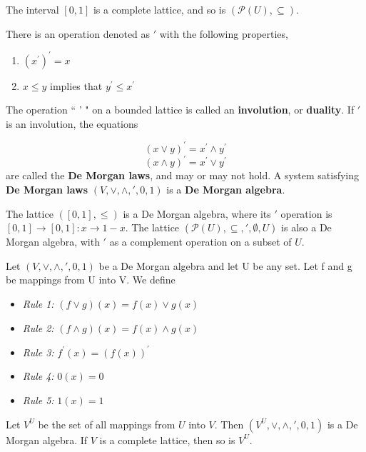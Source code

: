 The interval $[0,1]$ is a complete lattice, and so is $(\mathcal{P}(U),\subseteq)$.

There is an operation denoted as $'$ with the following properties,

\begin{enumerate}

\item $(x^{'})^{'} = x$
\item $x \leq y$ implies that $y^{'} \leq x^{'}$

\end{enumerate}

The operation `` ' " on a bounded lattice is called an \textbf{involution}, or \textbf{duality}. If $'$ is an involution, the equations

\[(x \vee y)^{'} = x^{'} \wedge y^{'}\]
\[(x \wedge y)^{'} = x^{'} \vee y^{'}\]
are called the \textbf{De Morgan laws}, and may or may not hold. A system satisfying \textbf{De Morgan laws} $(V,\vee,\wedge,',0,1)$ is a \textbf{De Morgan algebra}.

The lattice $([0,1], \leq)$ is a De Morgan algebra, where its $'$ operation is $[0,1] \rightarrow [0,1]: x \rightarrow 1-x$. The lattice $(\mathcal{P}(U), \subseteq, ', \emptyset, U)$ is also a De Morgan algebra, with $'$ as a complement operation on a subset of $U$.

\begin{thm}
\label{thm:correspondingtheorem}
Let $(V,\vee,\wedge,',0,1)$ be a De Morgan algebra and let U be any set. Let f and g be mappings from U into V. We define

\begin{itemize}

\item \textit{Rule 1:} $(f \vee g)(x) = f(x) \vee g(x)$
\item \textit{Rule 2:} $(f \wedge g)(x) = f(x) \wedge g(x)$
\item \textit{Rule 3:} $f^{'}(x) = (f(x))^{'}$
\item \textit{Rule 4:} $0(x) = 0$
\item \textit{Rule 5:} $1(x) = 1$

\end{itemize}

Let $V^{U}$ be the set of all mappings from $U$ into $V$. Then $(V^{U},\vee,\wedge,',0,1)$ is a De Morgan algebra. If $V$ is a complete lattice, then so is $V^{U}$.
\end{thm}

